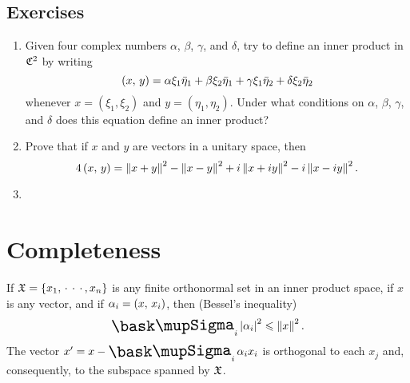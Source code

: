 {\small
\subsection*{Exercises}
\begin{enumerate}[wide]
    \item Given four complex numbers \(\alpha\), \(\beta\), \(\gamma\), and \(\delta\), try to define an inner product in \(\mathfrak{C}^2\) by writing
    \begin{equation}
        \left(x,\,y\right) = \alpha \xi_1 \bar{\eta}_1 + \beta \xi_2 \bar{\eta}_1 + \gamma \xi_1 \bar{\eta}_2 + \delta \xi_2 \bar{\eta}_2
    \end{equation}
    whenever \(x = (\xi_1, \xi_2)\) and \(y = (\eta_1, \eta_2)\). Under what conditions on \(\alpha\), \(\beta\), \(\gamma\), and \(\delta\) does this equation define an inner product?
    \item Prove that if \(x\) and \(y\) are vectors in a unitary space, then
    \begin{equation*}
        4\left(x,\,y\right) = \left\lVert x + y\right\rVert^2 - \left\lVert x - y\right\rVert^2 + i\left\lVert x + iy\right\rVert^2 - i\left\lVert x - iy\right\rVert^2.
    \end{equation*}
    \item 
\end{enumerate}
}

\section{Completeness}

\begin{theorem}
    If \(\frak{X} = \{x_1, \, \cdot\, \cdot\, \cdot\,, x_n\}\) is any finite orthonormal set in an inner product space, if \(x\) is any vector, and if \(\alpha_i = \left(x,\,x_i\right)\), then (Bessel's inequality)
    \begin{equation*}
        \sumx_i \abs{\alpha_i}^2 \leq \norm{x}^2.
    \end{equation*}
    The vector \(x' = x - \sumx_i \alpha_i x_i\) is orthogonal to each \(x_j\) and, consequently, to the subspace spanned by \(\frak{X}\).
\end{theorem}

